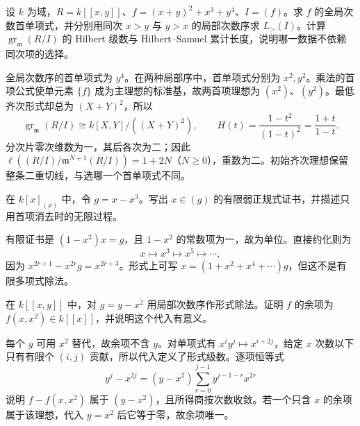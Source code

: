 \begin{exercise}\label{b3:ex:F-leading-versus-initial}
	设 \(k\) 为域，\(R=k[\![x,y]\!]\)、\(f=(x+y)^2+x^3+y^4\)、\(I=(f)\)。求 \(f\) 的全局次数首单项式，并分别用同次 \(x>y\) 与 \(y>x\) 的局部次数序求 \(L_>(I)\)。计算 \(\operatorname{gr}_{\mathfrak m}(R/I)\) 的 Hilbert 级数与 Hilbert--Samuel 累计长度，说明哪一数据不依赖同次项的选择。
\end{exercise}
\begin{solution}
	全局次数序的首单项式为 \(y^4\)。在两种局部序中，首单项式分别为 \(x^2,y^2\)。乘法的首项公式使单元素 \(\{f\}\) 成为主理想的标准基，故两首项理想为 \((x^2)\)、\((y^2)\)。最低齐次形式却总为 \((X+Y)^2\)，所以
	\[
		\operatorname{gr}_{\mathfrak m}(R/I)\cong k[X,Y]/((X+Y)^2),\qquad H(t)=\dfrac{1-t^2}{(1-t)^2}=\dfrac{1+t}{1-t}.
	\]
	分次片零次维数为一，其后各次为二；因此 \(\ell((R/I)/\mathfrak m^{N+1}(R/I))=1+2N\)（\(N\ge0\)），重数为二。初始齐次理想保留整条二重切线，与选哪一个首单项式不同。
\end{solution}

\begin{exercise}\label{b3:ex:F-weak-certificate}
	在 \(k[x]_{(x)}\) 中，令 \(g=x-x^3\)。写出 \(x\in(g)\) 的有限弱正规式证书，并描述只用首项消去时的无限过程。
\end{exercise}
\begin{solution}
	有限证书是 \((1-x^2)x=g\)，且 \(1-x^2\) 的常数项为一，故为单位。直接约化则为
	\[
		x\longmapsto x^3\longmapsto x^5\longmapsto\cdots,
	\]
	因为 \(x^{2r+1}-x^{2r}g=x^{2r+3}\)。形式上可写 \(x=(1+x^2+x^4+\cdots)g\)，但这不是有限多项式除法。
\end{solution}

\begin{exercise}\label{b3:ex:F-formal-division}
	在 \(k[\![x,y]\!]\) 中，对 \(g=y-x^2\) 用局部次数序作形式除法。证明 \(f\) 的余项为 \(f(x,x^2)\in k[\![x]\!]\)，并说明这个代入有意义。
\end{exercise}
\begin{solution}
	每个 \(y\) 可用 \(x^2\) 替代，故余项不含 \(y\)。对单项式有 \(x^iy^j\mapsto x^{i+2j}\)，给定 \(x\) 次数以下只有有限个 \((i,j)\) 贡献，所以代入定义了形式级数。逐项恒等式
	\[
		y^j-x^{2j}=(y-x^2)\sum_{r=0}^{j-1}y^{j-1-r}x^{2r}
	\]
	说明 \(f-f(x,x^2)\) 属于 \((y-x^2)\)，且所得商按次数收敛。若一个只含 \(x\) 的余项属于该理想，代入 \(y=x^2\) 后它等于零，故余项唯一。
\end{solution}

